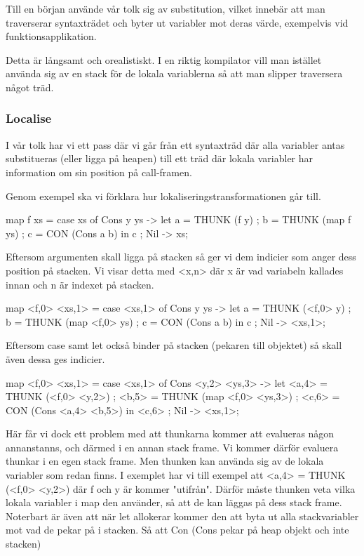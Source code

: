 \documentclass[../Core]{subfiles}
\begin{document}
Till en början använde vår tolk sig av substitution, vilket innebär att man
traverserar syntaxträdet och byter ut variabler mot deras värde, exempelvis vid
funktionsapplikation.

Detta är långsamt och orealistiskt. I en riktig kompilator vill man istället använda
sig av en stack för de lokala variablerna så att man slipper traversera något träd.

\subsubsection{Localise}

I vår tolk har vi ett pass där vi går från ett syntaxträd där alla variabler
antas substitueras (eller ligga på heapen) till ett träd där lokala variabler
har information om sin position på call-framen.

Genom exempel ska vi förklara hur lokaliseringstransformationen går till.


\begin{codeEx}
map f xs = case xs of
    { Cons y ys -> let
        { a = THUNK (f y)
        ; b = THUNK (map f ys)
        ; c = CON (Cons a b)
        } in c
    ; Nil -> xs};
\end{codeEx}

Eftersom argumenten skall ligga på stacken så ger vi dem indicier som anger dess position på stacken. Vi
visar detta med <x,n> där x är vad variabeln kallades innan och n är indexet på
stacken.

\begin{codeEx}
map <f,0> <xs,1> = case <xs,1> of
    { Cons y ys -> let
        { a = THUNK (<f,0> y)
        ; b = THUNK (map <f,0> ys)
        ; c = CON (Cons a b)
        } in c
    ; Nil -> <xs,1>};
\end{codeEx}

Eftersom case samt let också binder på stacken (pekaren till objektet) så skall även dessa
ges indicier.

\begin{codeEx}
map <f,0> <xs,1> = case <xs,1> of
    { Cons <y,2> <ys,3> -> let
        { <a,4> = THUNK (<f,0> <y,2>)
        ; <b,5> = THUNK (map <f,0> <ys,3>)
        ; <c,6> = CON (Cons <a,4> <b,5>)
        } in <c,6>
    ; Nil -> <xs,1>};
\end{codeEx}

Här får vi dock ett problem med att thunkarna kommer att evalueras någon annanstanns, och därmed
i en annan stack frame. Vi kommer därför evaluera thunkar i en egen stack frame. Men thunken kan använda sig av
de lokala variabler som redan finns. I exemplet har vi till exempel att <a,4> = THUNK (<f,0> <y,2>)
där f och y är kommer "utifrån". Därför måste 
thunken veta vilka lokala variabler i map den använder, så att de kan läggas på dess stack frame. 
Noterbart är även att när let allokerar kommer den att byta ut alla stackvariabler
mot vad de pekar på i stacken. Så att Con (Cons pekar på heap objekt och inte stacken)
\end{document}
